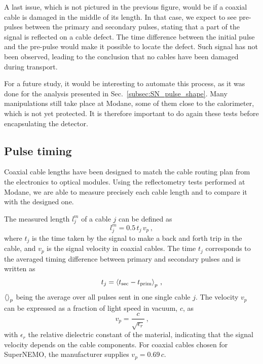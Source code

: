 A last issue, which is not pictured in the previous figure, would be if a coaxial cable is damaged in the middle of its length.
In that case, we expect to see pre-pulses between the primary and secondary pulses, stating that a part of the signal is reflected on a cable defect.
The time difference between the initial pulse and the pre-pulse would make it possible to locate the defect.
Such signal has not been observed, leading to the conclusion that no cables have been damaged during transport.

For a future study, it would be interesting to automate this process, as it was done for the analysis presented in Sec.~\ref{subsec:SN_pulse_shape}.
Many manipulations still take place at Modane, some of them close to the calorimeter, which is not yet protected.
It is therefore important to do again these tests before encapsulating the detector.

\subsection{Pulse timing}
\label{subsec:timing}

Coaxial cable lengths have been designed to match the cable routing plan from the electronics to optical modules.
Using the reflectometry tests performed at Modane, we are able to measure precisely each cable length and to compare it with the designed one.

The measured length $l_{j}^{m}$ of a cable $j$ can be defined as
\begin{equation}
  l_{j}^{m}= 0.5\,t_{j}\,v_{p}\, ,
\end{equation}
where $t_{j}$ is the time taken by the signal to make a back and forth trip in the cable, and $v_{p}$ is the signal velocity in coaxial cables.
The time $t_{j}$ corresponds to the averaged timing difference between primary and secondary pulses and is written as
\begin{equation}
  t_{j} = \braket{t_{\text{sec}}-t_{\text{prim}}}_{p} \, \text{,}
  \label{eq:t_j}
\end{equation}
$\braket{}_{p}$ being the average over all pulses sent in one single cable $j$.
The velocity $v_{p}$ can be expressed as a fraction of light speed in vacuum, $c$, as
\begin{equation*}
  v_{p}=\frac{c}{\sqrt{\epsilon_{r}}}\,\text{,}
\end{equation*}
with $\epsilon_{r}$ the relative dielectric constant of the material, indicating that the signal velocity depends on the cable components.
For coaxial cables chosen for SuperNEMO, the manufacturer supplies ${v_{p}=0.69\,c}$.

